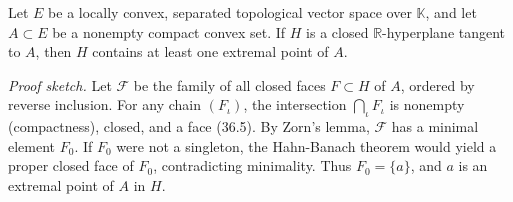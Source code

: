 Let $E$ be a locally convex, separated topological vector space over $\mathbb{K}$, and let $A \subset E$ be a nonempty compact convex set. If $H$ is a closed $\mathbb{R}$-hyperplane tangent to $A$, then $H$ contains at least one extremal point of $A$.

\noindent\textit{Proof sketch.} Let $\mathcal{F}$ be the family of all closed faces $F \subset H$ of $A$, ordered by reverse inclusion. For any chain $(F_\iota)$, the intersection $\bigcap_\iota F_\iota$ is nonempty (compactness), closed, and a face (36.5). By Zorn's lemma, $\mathcal{F}$ has a minimal element $F_0$. If $F_0$ were not a singleton, the Hahn-Banach theorem would yield a proper closed face of $F_0$, contradicting minimality. Thus $F_0 = \{a\}$, and $a$ is an extremal point of $A$ in $H$.
